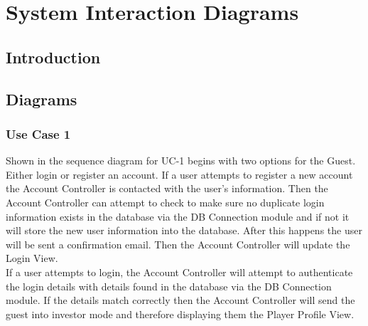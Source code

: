 \chapter{System Interaction Diagrams}


\section{Introduction}



\section{Diagrams}

\subsection{Use Case 1}

Shown in the sequence diagram for UC-1 begins with two options for the Guest.
Either login or register an account. If a user attempts to register a new
account the Account Controller is contacted with the user’s information. Then
the Account Controller can attempt to check to make sure no duplicate login
information exists in the database via the DB Connection module and if not it
will store the new user information into the database. After this happens the
user will be sent a confirmation email. Then the Account Controller will update
the Login View.\\

If a user attempts to login, the Account Controller will attempt to authenticate
the login details with details found in the database via the DB Connection
module. If the details match correctly then the Account Controller will send the
guest into investor mode and therefore displaying them the Player Profile View.

